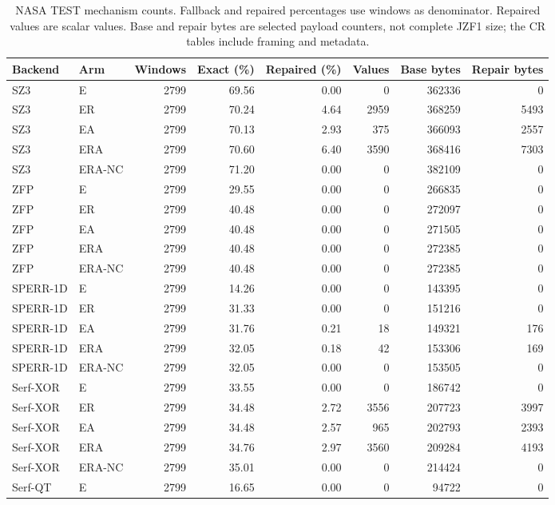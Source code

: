 \begin{table}[t]
\centering
\small
\setlength{\tabcolsep}{5pt}
\caption{NASA TEST mechanism counts. Fallback and repaired percentages use windows as denominator. Repaired values are scalar values. Base and repair bytes are selected payload counters, not complete JZF1 size; the CR tables include framing and metadata.}
\label{tab:s-ablation-mechanism-anomaly}
\begin{tabular}{@{}llrrrrrr@{}}
\toprule
Backend & Arm & Windows & Exact (\%) & Repaired (\%) & Values & Base bytes & Repair bytes \\
\midrule
SZ3 & E & 2799 & 69.56 & 0.00 & 0 & 362336 & 0 \\
SZ3 & ER & 2799 & 70.24 & 4.64 & 2959 & 368259 & 5493 \\
SZ3 & EA & 2799 & 70.13 & 2.93 & 375 & 366093 & 2557 \\
SZ3 & ERA & 2799 & 70.60 & 6.40 & 3590 & 368416 & 7303 \\
SZ3 & ERA-NC & 2799 & 71.20 & 0.00 & 0 & 382109 & 0 \\
ZFP & E & 2799 & 29.55 & 0.00 & 0 & 266835 & 0 \\
ZFP & ER & 2799 & 40.48 & 0.00 & 0 & 272097 & 0 \\
ZFP & EA & 2799 & 40.48 & 0.00 & 0 & 271505 & 0 \\
ZFP & ERA & 2799 & 40.48 & 0.00 & 0 & 272385 & 0 \\
ZFP & ERA-NC & 2799 & 40.48 & 0.00 & 0 & 272385 & 0 \\
SPERR-1D & E & 2799 & 14.26 & 0.00 & 0 & 143395 & 0 \\
SPERR-1D & ER & 2799 & 31.33 & 0.00 & 0 & 151216 & 0 \\
SPERR-1D & EA & 2799 & 31.76 & 0.21 & 18 & 149321 & 176 \\
SPERR-1D & ERA & 2799 & 32.05 & 0.18 & 42 & 153306 & 169 \\
SPERR-1D & ERA-NC & 2799 & 32.05 & 0.00 & 0 & 153505 & 0 \\
Serf-XOR & E & 2799 & 33.55 & 0.00 & 0 & 186742 & 0 \\
Serf-XOR & ER & 2799 & 34.48 & 2.72 & 3556 & 207723 & 3997 \\
Serf-XOR & EA & 2799 & 34.48 & 2.57 & 965 & 202793 & 2393 \\
Serf-XOR & ERA & 2799 & 34.76 & 2.97 & 3560 & 209284 & 4193 \\
Serf-XOR & ERA-NC & 2799 & 35.01 & 0.00 & 0 & 214424 & 0 \\
Serf-QT & E & 2799 & 16.65 & 0.00 & 0 & 94722 & 0 \\

\end{tabular}
\end{table}
